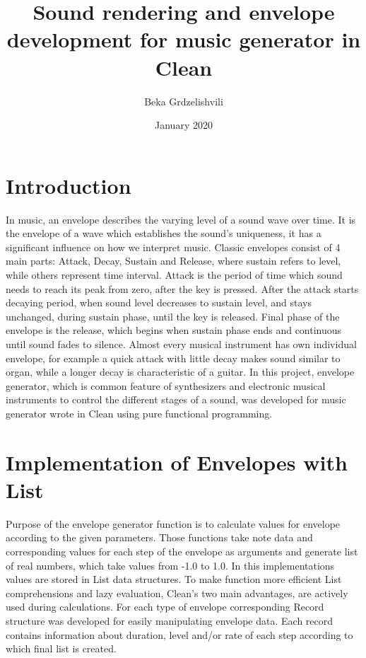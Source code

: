 \documentclass[runningheads]{llncs}
\title{Sound rendering and envelope development for music generator in Clean}
\author{Beka Grdzelishvili}
\date{January 2020}
\begin{document}
\maketitle

\section{Introduction}
In music, an envelope describes the varying level of a sound wave over time. It is the envelope of a wave which establishes the sound’s uniqueness, it has a significant influence on how we interpret music. Classic envelopes consist of 4 main parts: Attack, Decay, Sustain and Release, where sustain refers to level, while others represent time interval. Attack is the period of time which sound needs to reach its peak from zero, after the key is pressed. After the attack starts decaying period, when sound level decreases to sustain level, and stays unchanged, during sustain phase, until the key is released. Final phase of the envelope is the release, which begins when sustain phase ends and continuous until sound fades to silence. Almost every musical instrument has own individual envelope, for example a quick attack with little decay makes sound similar to organ, while a longer decay is characteristic of a guitar. In this project, envelope generator, which is common feature of synthesizers and electronic musical instruments to control the different stages of a sound, was developed for music generator wrote in Clean using pure functional programming.

\section{Implementation of Envelopes with List}

Purpose of the envelope generator function is to calculate values for envelope according to the given parameters. Those functions take note data and corresponding values for each step of the envelope as arguments and generate list of real numbers, which take values from -1.0 to 1.0. In this implementations values are stored in List data structures. To make function more efficient List comprehensions and lazy evaluation, Clean’s two main advantages, are actively used during calculations. For each type of envelope corresponding Record structure was developed for easily manipulating envelope data. Each record contains information about duration, level and/or rate of each step according to which final list is created. 
\end{document}

